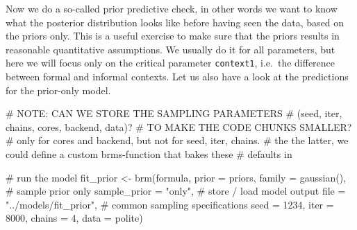 \documentclass[
  doc,
  floatsintext,
  longtable,
  nolmodern,
  notxfonts,
  notimes,
  colorlinks=true,linkcolor=blue,citecolor=blue,urlcolor=blue]{apa7}
\newenvironment{Shaded}{\begin{snugshade}}{\end{snugshade}}
\newcommand{\AlertTok}[1]{\textcolor[rgb]{0.68,0.00,0.00}{#1}}
\newcommand{\AttributeTok}[1]{\textcolor[rgb]{0.40,0.45,0.13}{#1}}
\newcommand{\CommentTok}[1]{\textcolor[rgb]{0.37,0.37,0.37}{#1}}
\newcommand{\DecValTok}[1]{\textcolor[rgb]{0.68,0.00,0.00}{#1}}
\newcommand{\FunctionTok}[1]{\textcolor[rgb]{0.28,0.35,0.67}{#1}}
\newcommand{\NormalTok}[1]{\textcolor[rgb]{0.00,0.23,0.31}{#1}}
\newcommand{\OtherTok}[1]{\textcolor[rgb]{0.00,0.23,0.31}{#1}}
\newcommand{\StringTok}[1]{\textcolor[rgb]{0.13,0.47,0.30}{#1}}
\begin{document}
Now we do a so-called prior predictive check, in other words we want to
know what the posterior distribution looks like before having seen the
data, based on the priors only. This is a useful exercise to make sure
that the priors results in reasonable quantitative assumptions. We
usually do it for all parameters, but here we will focus only on the
critical parameter \texttt{context1}, i.e.~the difference between formal
and informal contexts. Let us also have a look at the predictions for
the prior-only model.

\begin{Shaded}
\begin{Highlighting}[]
\CommentTok{\# }\AlertTok{NOTE}\CommentTok{: CAN WE STORE THE SAMPLING PARAMETERS }
\CommentTok{\#       (seed, iter, chains, cores, backend, data)? }
\CommentTok{\#       TO MAKE THE CODE CHUNKS SMALLER?}
\CommentTok{\# only for \textquotesingle{}cores\textquotesingle{} and \textquotesingle{}backend\textquotesingle{}, but not for seed, iter, chains.}
\CommentTok{\# the the latter, we could define a custom brms{-}function that bakes these}
\CommentTok{\# defaults in}


\CommentTok{\# run the model}
\NormalTok{fit\_prior }\OtherTok{\textless{}{-}} \FunctionTok{brm}\NormalTok{(formula,}
           \AttributeTok{prior =}\NormalTok{ priors,}
           \AttributeTok{family =} \FunctionTok{gaussian}\NormalTok{(),}
           \CommentTok{\# sample prior only}
           \AttributeTok{sample\_prior =} \StringTok{"only"}\NormalTok{,}
           \CommentTok{\# store / load model output}
           \AttributeTok{file  =} \StringTok{"../models/fit\_prior"}\NormalTok{,}
           \CommentTok{\# common sampling specifications}
           \AttributeTok{seed =} \DecValTok{1234}\NormalTok{,}
           \AttributeTok{iter =} \DecValTok{8000}\NormalTok{,}
           \AttributeTok{chains =} \DecValTok{4}\NormalTok{,}
           \AttributeTok{data =}\NormalTok{ polite)}
\end{Highlighting}
\end{Shaded}
\end{document}
